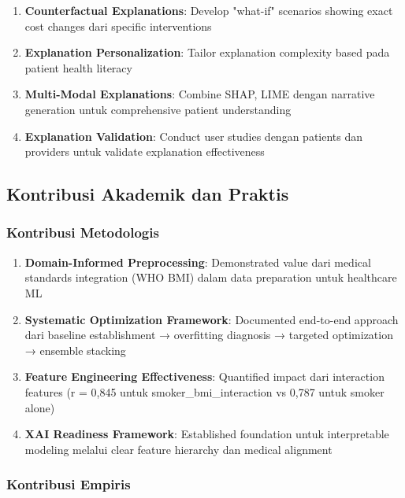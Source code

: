 \begin{enumerate}
    \item \textbf{Counterfactual Explanations}: Develop "what-if" scenarios showing exact cost changes dari specific interventions

    \item \textbf{Explanation Personalization}: Tailor explanation complexity based pada patient health literacy

    \item \textbf{Multi-Modal Explanations}: Combine SHAP, LIME dengan narrative generation untuk comprehensive patient understanding

    \item \textbf{Explanation Validation}: Conduct user studies dengan patients dan providers untuk validate explanation effectiveness
\end{enumerate}

\subsection{Kontribusi Akademik dan Praktis}
\label{subsec:kontribusi}

\subsubsection{Kontribusi Metodologis}

\begin{enumerate}
    \item \textbf{Domain-Informed Preprocessing}: Demonstrated value dari medical standards integration (WHO BMI) dalam data preparation untuk healthcare ML

    \item \textbf{Systematic Optimization Framework}: Documented end-to-end approach dari baseline establishment → overfitting diagnosis → targeted optimization → ensemble stacking

    \item \textbf{Feature Engineering Effectiveness}: Quantified impact dari interaction features (r = 0,845 untuk smoker\_bmi\_interaction vs 0,787 untuk smoker alone)

    \item \textbf{XAI Readiness Framework}: Established foundation untuk interpretable modeling melalui clear feature hierarchy dan medical alignment
\end{enumerate}

\subsubsection{Kontribusi Empiris}

